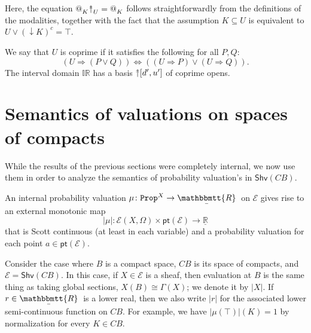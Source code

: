 \documentclass[11pt, oneside, article]{memoir}
\makeatletter
\theoremstyle{plain}
\theoremstyle{definition}
\theoremstyle{remark}
\newcommand{\const}[1]{\mathtt{#1}}
\newcommand{\cat}[1]{\mathcal{#1}}
\newcommand{\Fun}[1]{\mathsf{#1}}
\newcommand{\ul}[1]{\underline{#1}}
\newcommand{\ubar}[1]{\underaccent{\bar}{#1}}
\newcommand{\internal}[1]{\raisebox{-.03ex}{$\mathbbmtt{#1}$}}
\newcommand{\hs}{\hspace{1.1pt}}
\newcommand{\IR}{\mathbb{IR}} %
\newcommand{\LR}{\ul{\mathbb{R}}}
\newcommand{\tRR}{\internal{R}\hs}
\newcommand{\tLR}{\ubar{\tRR}\hs}
\newcommand{\Shv}{\Fun{Shv}}
\newcommand{\Prop}{\const{Prop}}
\newcommand{\pt}{\Fun{pt}}
\newcommand{\BaseSpace}{B}
\newcommand{\AtSymbol}{{@}}
\newcommand{\InSymbol}{{\upclose}}%
\newcommand{\At}[2][]{\AtSymbol^{#1}_{#2}}
\newcommand{\In}[2][]{\InSymbol^{#1}_{#2}}
\newcommand{\upclose}{{\rotatebox[origin=c]{90}{$\twoheadrightarrow$}}}
\newcommand{\imp}{\Rightarrow}
\renewcommand{\iff}{\Leftrightarrow}
\makeatother
\begin{document}
Here, the equation $\At{K}\In{U} = \At{K}$ follows straightforwardly from the definitions of the modalities, together with the fact that the assumption $K\subseteq U$ is equivalent to $U \lor (\downarrow K)^c = \top$.

We say that $U$ is coprime if it satisfies the following for all $P,Q$:
\[(U\imp (P\vee Q))\iff((U\imp P)\vee(U\imp Q)).\]
The interval domain $\IR$ has a basis $\upclose[d',u']$ of coprime opens. 







\chapter{Semantics of valuations on spaces of compacts}

While the results of the previous sections were completely internal, we now use them in order to analyze the semantics of probability valuation's in $\Shv(C\BaseSpace)$.

An internal probability valuation $\mu\colon\Prop^X\to\tLR$ on $\cat{E}$ gives rise to an external monotonic map
\[|\mu|\colon\cat{E}(X,\Omega)\times\pt(\cat{E})\to\LR\]
that is Scott continuous (at least in each variable) and a probability valuation for each point $a\in\pt(\cat{E})$.


Consider the case where $\BaseSpace$ is a compact space, $C\BaseSpace$ is its space of compacts, and $\cat{E}=\Shv(C\BaseSpace)$. In this case, if $X\in\cat{E}$ is a sheaf, then evaluation at $\BaseSpace$ is the same thing as taking global sections, $X(\BaseSpace)\cong\Gamma(X)$; we denote it by $|X|$. If $r\in\tLR$ is a lower real, then we also write $|r|$ for the associated lower semi-continuous function on $C\BaseSpace$. For example, we have $|\mu(\top)|(K) = 1$ by normalization for every $K\in C\BaseSpace$.
\end{document}
